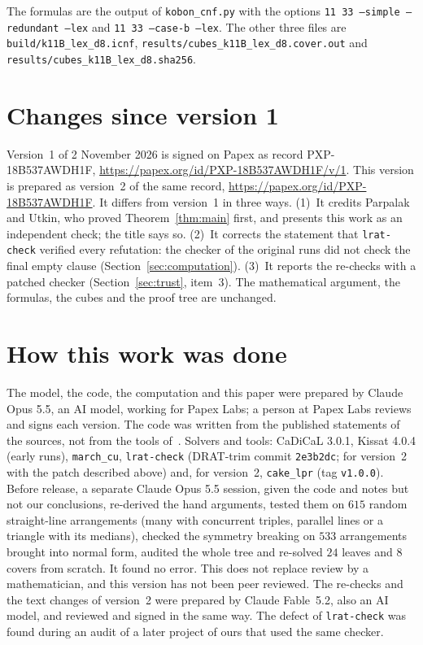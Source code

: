 \documentclass[11pt]{article}
\theoremstyle{definition}
\theoremstyle{remark}
\begin{document}
\smallskip
\noindent The formulas are the output of \texttt{kobon\_cnf.py} with the options
\texttt{11 33 --simple --redundant --lex} and \texttt{11 33 --case-b --lex}. The other three files
are \nolinkurl{build/k11B_lex_d8.icnf}, \nolinkurl{results/cubes_k11B_lex_d8.cover.out} and
\nolinkurl{results/cubes_k11B_lex_d8.sha256}.

\section*{Changes since version 1}
Version~1 of 2 November 2026 is signed on Papex as record PXP-18B537AWDH1F,
\url{https://papex.org/id/PXP-18B537AWDH1F/v/1}. This version is prepared as version~2 of the
same record, \url{https://papex.org/id/PXP-18B537AWDH1F}. It differs from version~1 in three ways. (1)~It
credits Parpalak and Utkin, who proved Theorem~\ref{thm:main} first, and presents this work as an
independent check; the title says so. (2)~It corrects the statement that \texttt{lrat-check}
verified every refutation: the checker of the original runs did not check the final empty clause
(Section~\ref{sec:computation}). (3)~It reports the re-checks with a patched checker
(Section~\ref{sec:trust}, item~3). The mathematical argument, the formulas, the cubes and the
proof tree are unchanged.

\section*{How this work was done}
The model, the code, the computation and this paper were prepared by Claude Opus 5.5, an AI model,
working for Papex Labs; a person at Papex Labs reviews and signs each version. The code was written
from the published statements of the sources, not from the tools of~\cite{savchuk}. Solvers and
tools: CaDiCaL 3.0.1, Kissat 4.0.4 (early runs), \texttt{march\_cu}, \texttt{lrat-check}
(DRAT-trim commit \texttt{2e3b2dc}; for version~2 with the patch described above) and, for
version~2, \texttt{cake\_lpr} (tag \texttt{v1.0.0}).
Before release, a separate Claude Opus 5.5 session, given the code and notes but not our
conclusions, re-derived the hand arguments, tested them on $615$ random straight-line arrangements
(many with concurrent triples, parallel lines or a triangle with its medians), checked the
symmetry breaking on $533$ arrangements brought into normal form, audited the whole tree and
re-solved $24$ leaves and $8$ covers from scratch. It found no error. This does not replace review
by a mathematician, and this version has not been peer reviewed. The re-checks and the text
changes of version~2 were prepared by Claude Fable~5.2, also an AI model, and reviewed and signed
in the same way. The defect of \texttt{lrat-check} was found during an audit of a later project
of ours that used the same checker.
\end{document}
